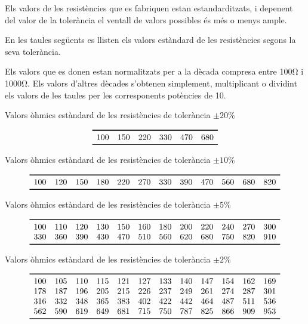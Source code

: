 Els valors de les resist\`{e}ncies que es fabriquen estan estandarditzats, i depenent
del valor de la toler\`{a}ncia el ventall de valors possibles \'{e}s m\'{e}s o menys ample.

En les taules seg\"{u}ents es llisten els valors est\`{a}ndard de les resist\`{e}ncies segons la seva
toler\`{a}ncia.

Els valors que es donen estan normalitzats per a la d\`{e}cada compresa
entre 100\unit{\ohm} i 1000\unit{\ohm}. Els valors d'altres d\`{e}cades
s'obtenen simplement, multiplicant o dividint els valors de les
taules per les corresponents  pot\`{e}ncies de 10.

\begin{table}[htb]
   \caption{Valors \`{o}hmics est\`{a}ndard de les resist\`{e}ncies de toler\`{a}ncia $\pm20\unit{\%}$}
   \[ \begin{array}{cccccc}
   \toprule[1pt]
   100 & 150 & 220 & 330 & 470 &  680  \\
   \bottomrule[1pt]
   \end{array}   \]
\end{table}

\begin{table}[htb]
   \caption{Valors \`{o}hmics est\`{a}ndard de les resist\`{e}ncies de toler\`{a}ncia $\pm10\unit{\%}$}
   \[ \begin{array}{cccccccccccc}
   \toprule[1pt]
   100 & 120 & 150 & 180 & 220 & 270 & 330 & 390 & 470 & 560 & 680 & 820 \\
   \bottomrule[1pt]
   \end{array}   \]
\end{table}

\begin{table}[htb]
   \caption{Valors \`{o}hmics est\`{a}ndard de les resist\`{e}ncies de toler\`{a}ncia $\pm5\unit{\%}$}
   \[ \begin{array}{cccccccccccc}
   \toprule[1pt]
   100 & 110 & 120 & 130 & 150 & 160 & 180 & 200 & 220 & 240 & 270 & 300 \\
   330 & 360 & 390 & 430 & 470 & 510 & 560 & 620 & 680 & 750 & 820 & 910 \\
   \bottomrule[1pt]
   \end{array}   \]
\end{table}

\begin{table}[htb]
   \caption{Valors \`{o}hmics est\`{a}ndard de les resist\`{e}ncies de toler\`{a}ncia $\pm2\unit{\%}$}
   \[ \begin{array}{cccccccccccc}
   \toprule[1pt]
   100 & 105 & 110 & 115 & 121 & 127 & 133 & 140 & 147 & 154 & 162 & 169 \\
   178 & 187 & 196 & 205 & 215 & 226 & 237 & 249 & 261 & 274 & 287 & 301 \\
   316 & 332 & 348 & 365 & 383 & 402 & 422 & 442 & 464 & 487 & 511 & 536 \\
   562 & 590 & 619 & 649 & 681 & 715 & 750 & 787 & 825 & 866 & 909 & 953 \\
   \bottomrule[1pt]
   \end{array}   \]
\end{table}

